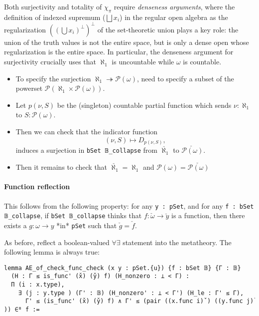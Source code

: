\documentclass[sigplan,10pt,review, anonymous]{acmart}
\theoremstyle{definition}
\begin{document}
Both surjectivity and totality of \(\chi_{\pi}\) require \emph{denseness arguments}, where the definition of indexed supremum (\(\bigsqcup x_i\)) in the regular open algebra as the regularization \(((\bigcup x_i)^\perp)^\perp\) of the set-theoretic union plays a key role: the union of the truth values is not the entire space, but is only a dense open whose regularization is the entire space. In particular, the denseness argument for surjectivity crucially uses that \(\aleph_1\) is uncountable while \(\omega\) is countable.


\begin{itemize}
 \item To specify the surjection \(\aleph_1 \twoheadrightarrow \mathcal{P}(\omega)\), need to specify a subset of the powerset \(\mathcal{P}(\aleph_1 \times \mathcal{P}(\omega))\).

 \item Let \(p(\nu, S)\) be the (singleton) countable partial function which sends \(\nu : \aleph_1\) to \(S : \mathcal{P}(\omega)\).

 \item Then we can check that the indicator function
\[ (\nu, S) \mapsto D_{p(\nu,S)}, \]
induces a surjection in \lstinline{bSet 𝔹_collapse} from \(\check{\aleph_1}\) to \(\check{\mathcal{P}(\omega)}\).

 \item Then it remains to check that \(\check{\aleph_1} = \aleph_1\) and \(\mathcal{P}(\omega) = \check{\mathcal{P}(\omega)}\)
\end{itemize}

\paragraph{Function reflection}

This follows from the following property: for any \lstinline{y : pSet}, and for any \lstinline{f : bSet 𝔹_collapse}, if \lstinline{bSet 𝔹_collapse} thinks that \(f : \check{\omega}  \to \check{y}\) is a function, then there exists a \(g : \omega \to y\) *in* \lstinline{pSet} such that \(\check{g} = \check{f}\).

As before, reflect a boolean-valued \(\forall \exists\) statement into the metatheory. The following lemma is always true:

\begin{lstlisting}
lemma AE_of_check_func_check (x y : pSet.{u}) {f : bSet 𝔹} {Γ : 𝔹}
  (H : Γ ≤ is_func' (x̌) (y̌) f) (H_nonzero : ⊥ < Γ) :
  Π (i : x.type),
    ∃ (j : y.type ) (Γ' : 𝔹) (H_nonzero' : ⊥ < Γ') (H_le : Γ' ≤ Γ),
      Γ' ≤ (is_func' (x̌) (y̌) f) ∧ Γ' ≤ (pair ((x.func i)̌ ) ((y.func j)̌ )) ∈ᴮ f :=
\end{lstlisting}
\end{document}
